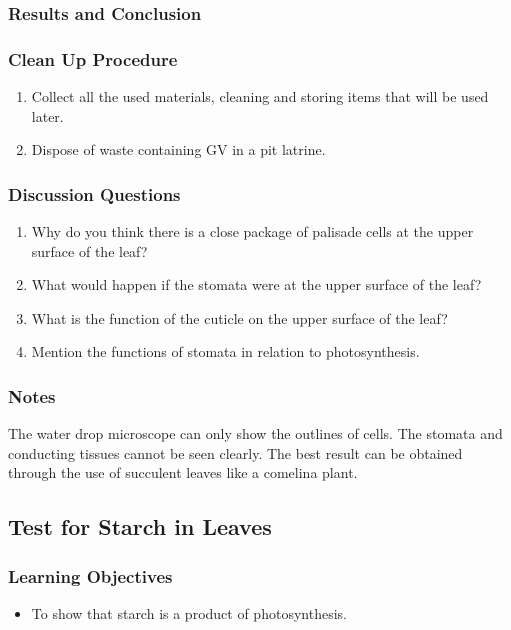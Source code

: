 \subsubsection*{Results and Conclusion}


\subsubsection*{Clean Up Procedure}
\begin{enumerate}
\item{Collect all the used materials, cleaning and storing items that will be used later.}
\item{Dispose of waste containing GV in a pit latrine.}
\end{enumerate}

\subsubsection*{Discussion Questions}
\begin{enumerate}
\item{Why do you think there is a close package of palisade cells at the upper surface of the leaf?}
\item{What would happen if the stomata were at the upper surface of the leaf?}
\item{What is the function of the cuticle on the upper surface of the leaf?}
\item{Mention the functions of stomata in relation to photosynthesis.}
\end{enumerate}

\subsubsection*{Notes}
The water drop microscope can only show the outlines of cells. The stomata and conducting tissues cannot be seen clearly. The best result can be obtained through the use of succulent leaves like a comelina plant.

\subsection{Test for Starch in Leaves}

\subsubsection*{Learning Objectives}
\begin{itemize}
\item{To show that starch is a product of photosynthesis.}
\end{itemize}


